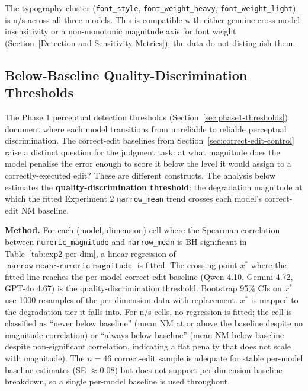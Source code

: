 The typography cluster (\texttt{font\_style}, \texttt{font\_weight\_heavy}, \texttt{font\_weight\_light}) is n/s across all three models. This is compatible with either genuine cross-model insensitivity or a non-monotonic magnitude axis for font weight (Section~\ref{Detection and Sensitivity Metrics}); the data do not distinguish them.

\subsection{Below-Baseline Quality-Discrimination Thresholds} \label{sec:thresholds}

The Phase 1 perceptual detection thresholds (Section~\ref{sec:phase1-thresholds}) document where each model transitions from unreliable to reliable perceptual discrimination. The correct-edit baselines from Section~\ref{sec:correct-edit-control} raise a distinct question for the judgment task: at what magnitude does the model penalise the error enough to score it below the level it would assign to a correctly-executed edit? These are different constructs. The analysis below estimates the \textbf{quality-discrimination threshold}: the degradation magnitude at which the fitted Experiment 2 \texttt{narrow\_mean} trend crosses each model's correct-edit NM baseline.

\textbf{Method.} For each (model, dimension) cell where the Spearman correlation between \texttt{numeric\_magnitude} and \texttt{narrow\_mean} is BH-significant in Table~\ref{tab:exp2-per-dim}, a linear regression of $\texttt{narrow\_mean} \sim \texttt{numeric\_magnitude}$ is fitted. The crossing point $x^*$ where the fitted line reaches the per-model correct-edit baseline (Qwen 4.10, Gemini 4.72, GPT-4o 4.67) is the quality-discrimination threshold. Bootstrap 95\% CIs on $x^*$ use 1000 resamples of the per-dimension data with replacement. $x^*$ is mapped to the degradation tier it falls into. For n/s cells, no regression is fitted; the cell is classified as ``never below baseline'' (mean NM at or above the baseline despite no magnitude correlation) or ``always below baseline'' (mean NM below baseline despite non-significant correlation, indicating a flat penalty that does not scale with magnitude). %
The $n = 46$ correct-edit sample is adequate for stable per-model baseline estimates (SE $\approx 0.08$) but does not support per-dimension baseline breakdown, so a single per-model baseline is used throughout.

